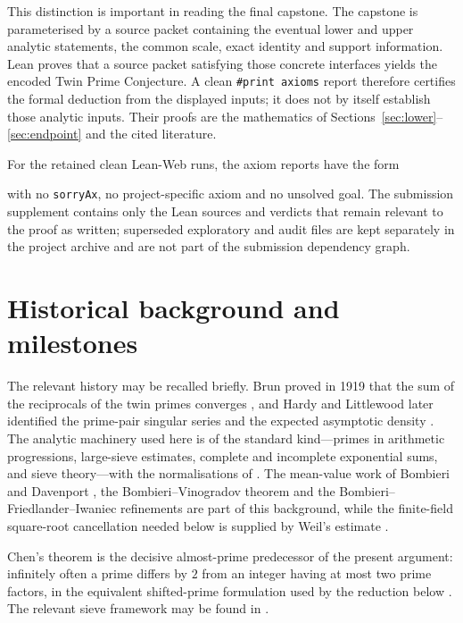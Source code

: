 \documentclass{aomart}
\theoremstyle{definition}
\newcommand{\1}{\mathbf 1}
\begin{document}
This distinction is important in reading the final capstone.  The capstone is parameterised by a source packet containing the eventual lower and upper analytic statements, the common scale, exact identity and support information.  Lean proves that a source packet satisfying those concrete interfaces yields the encoded Twin Prime Conjecture.  A clean \texttt{\#print axioms} report therefore certifies the formal deduction from the displayed inputs; it does not by itself establish those analytic inputs.  Their proofs are the mathematics of Sections~\ref{sec:lower}--\ref{sec:endpoint} and the cited literature.

For the retained clean Lean-Web runs, the axiom reports have the form
\begin{quote}
\footnotesize{}
\end{quote}
with no \texttt{sorryAx}, no project-specific axiom and no unsolved goal.  The submission supplement contains only the Lean sources and verdicts that remain relevant to the proof as written; superseded exploratory and audit files are kept separately in the project archive and are not part of the submission dependency graph.

\section{Historical background and milestones}

The relevant history may be recalled briefly.  Brun proved in 1919 that the sum of the reciprocals of the twin primes converges \cite{Brun1919}, and Hardy and Littlewood later identified the prime-pair singular series and the expected asymptotic density \cite{HardyLittlewood1923}.  The analytic machinery used here is of the standard kind---primes in arithmetic progressions, large-sieve estimates, complete and incomplete exponential sums, and sieve theory---with the normalisations of \cite{IwaniecKowalski2004}.  The mean-value work of Bombieri and Davenport \cite{BombieriDavenport1966}, the Bombieri--Vinogradov theorem and the Bombieri--Friedlander--Iwaniec refinements \cite{BFI1986,BFI1987} are part of this background, while the finite-field square-root cancellation needed below is supplied by Weil's estimate \cite{Weil1948}.

Chen's theorem is the decisive almost-prime predecessor of the present argument: infinitely often a prime differs by $2$ from an integer having at most two prime factors, in the equivalent shifted-prime formulation used by the reduction below \cite{Chen1973}.  The relevant sieve framework may be found in \cite{HalberstamRichert1974}.
\end{document}
